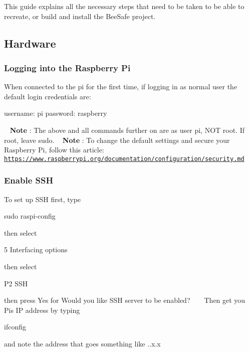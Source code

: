 This guide explains all the necessary steps that need to be taken to be able to recreate, or build and install the Bee\+Safe project.

\subsection*{Hardware}

\subsubsection*{Logging into the Raspberry Pi}

When connected to the pi for the first time, if logging in as normal user the default login credentials are\+: ~\newline
 
\begin{DoxyCode}
username: pi
password: raspberry
\end{DoxyCode}
 ~\newline
 {\bfseries Note} \+: The above and all commands further on are as user {\ttfamily pi}, N\+OT {\ttfamily root}. If {\ttfamily root}, leave {\ttfamily sudo}. ~\newline
 {\bfseries Note} \+: To change the default settings and secure your Raspberry Pi, follow this article\+: \href{https://www.raspberrypi.org/documentation/configuration/security.md}{\tt https\+://www.\+raspberrypi.\+org/documentation/configuration/security.\+md}

\subsubsection*{Enable S\+SH}

To set up S\+SH first, type 
\begin{DoxyCode}
sudo raspi-config
\end{DoxyCode}
 then select 
\begin{DoxyCode}
5 Interfacing options
\end{DoxyCode}
 then select 
\begin{DoxyCode}
P2 SSH
\end{DoxyCode}
 then press {\ttfamily Yes} for {\ttfamily Would you like S\+SH server to be enabled?} ~\newline
~\newline
 Then get you Pi\textquotesingle{}s IP address by typing ~\newline
 
\begin{DoxyCode}
ifconfig
\end{DoxyCode}
 and note the address that goes something like {..\+x.\+x} ~\newline
